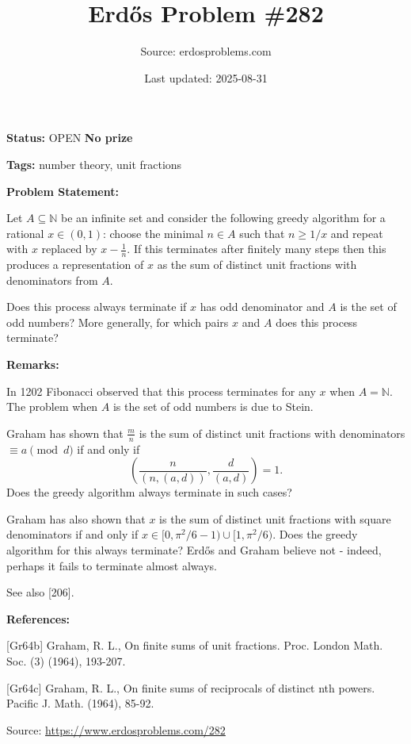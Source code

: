\documentclass{article}
\title{Erd\H{o}s Problem \#282}
\date{Last updated: 2025-08-31}
\author{Source: erdosproblems.com}
\begin{document}
\maketitle

\noindent\textbf{Status:} OPEN \quad \textbf{No prize}

\noindent\textbf{Tags:} number theory, unit fractions

\medskip
\noindent\textbf{Problem Statement:}

Let $A\subseteq \mathbb{N}$ be an infinite set and consider the following greedy algorithm for a rational $x\in (0,1)$: choose the minimal $n\in A$ such that $n\geq 1/x$ and repeat with $x$ replaced by $x-\frac{1}{n}$. If this terminates after finitely many steps then this produces a representation of $x$ as the sum of distinct unit fractions with denominators from $A$.

Does this process always terminate if $x$ has odd denominator and $A$ is the set of odd numbers? More generally, for which pairs $x$ and $A$ does this process terminate?

\bigskip
\noindent\textbf{Remarks:}

In 1202 Fibonacci observed that this process terminates for any $x$ when $A=\mathbb{N}$. The problem when $A$ is the set of odd numbers is due to Stein. 

Graham \cite{Gr64b} has shown that $\frac{m}{n}$ is the sum of distinct unit fractions with denominators $\equiv a\pmod{d}$ if and only if\[\left(\frac{n}{(n,(a,d))},\frac{d}{(a,d)}\right)=1.\]Does the greedy algorithm always terminate in such cases?

Graham \cite{Gr64c} has also shown that $x$ is the sum of distinct unit fractions with square denominators if and only if $x\in [0,\pi^2/6-1)\cup [1,\pi^2/6)$. Does the greedy algorithm for this always terminate? Erd\H{o}s and Graham believe not - indeed, perhaps it fails to terminate almost always.

See also [206].

\bigskip
\noindent\textbf{References:}

[Gr64b] Graham, R. L., On finite sums of unit fractions. Proc. London Math. Soc. (3) (1964), 193-207.
 
 [Gr64c] Graham, R. L., On finite sums of reciprocals of distinct nth powers. Pacific J. Math. (1964), 85-92.

\bigskip
\noindent\small{Source: \url{https://www.erdosproblems.com/282}}
\end{document}

